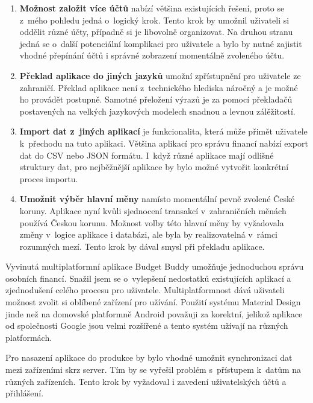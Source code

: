 \documentclass[
  biblatex,
  figures=true,
  tables=false,
  glossaries,
  index
]{kidiplom}
\begin{document}
\begin{enumerate}
  \item \textbf{Možnost založit více účtů} nabízí většina existujících řešení, proto se z~mého pohledu jedná o~logický krok. Tento krok by umožnil uživateli si oddělit různé účty, případně si je libovolně organizovat. Na druhou stranu jedná se o~další potenciální komplikaci pro uživatele a bylo by nutné zajistit vhodné přepínání účtů i správné zobrazení momentálně zvoleného účtu.
  \item \textbf{Překlad aplikace do jiných jazyků} umožní zpřístupnění pro uživatele ze zahraničí. Překlad aplikace není z~technického hlediska náročný a je možné ho provádět postupně. Samotné přeložení výrazů je za pomocí překladačů postavených na velkých jazykových modelech snadnou a levnou zálěžitostí.
  \item \textbf{Import dat z~jiných aplikací} je funkcionalita, která může přimět uživatele k~přechodu na tuto aplikaci. Většina aplikací pro správu financí nabízí export dat do CSV nebo JSON formátu. I~když různé aplikace mají odlišné struktury dat, pro nejběžnější aplikace by bylo možné vytvořit konkrétní proces importu.
  \item \textbf{Umožnit výběr hlavní měny} namísto momentální pevně zvolené České koruny. Aplikace nyní kvůli sjednocení transakcí v~zahraničních měnách používá Českou korunu. Možnost volby této hlavní měny by vyžadovala změny v~logice aplikace i databázi, ale byla by realizovatelná v~rámci rozumných mezí. Tento krok by dával smysl při překladu aplikace.
\end{enumerate}

\begin{kiconclusions}
Vyvinutá multiplatformní aplikace Budget Buddy umožňuje jednoduchou správu osobních financí. Snažil jsem se o~vylepšení nedostatků existujících aplikací a zjednodušení celého procesu pro uživatele. Multiplatformnost dává uživateli možnost zvolit si oblíbené zařízení pro užívání. Použití systému Material Design jinde než na domovské platformně Android považuji za korektní, jelikož aplikace od společnosti Google jsou velmi rozšířené a tento systém užívají na různých platformách.

Pro nasazení aplikace do produkce by bylo vhodné umožnit synchronizaci dat mezi zařízeními skrz server. Tím by se vyřešil problém s~přístupem k~datům na různých zařízeních. Tento krok by vyžadoval i zavedení uživatelských účtů a přihlášení.
\end{kiconclusions}
\end{document}
